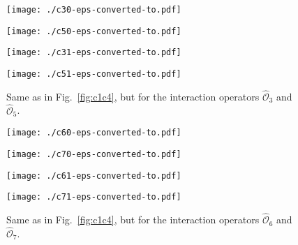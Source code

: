 \documentclass[11pt,a4paper]{article}
\begin{document}
\begin{figure}[t]
\begin{center}
\begin{minipage}[t]{0.49\linewidth}
\centering
\texttt{[image: ./c30-eps-converted-to.pdf]}
\end{minipage}
\begin{minipage}[t]{0.49\linewidth}
\centering
\texttt{[image: ./c50-eps-converted-to.pdf]}
\end{minipage}
\begin{minipage}[t]{0.49\linewidth}
\centering
\texttt{[image: ./c31-eps-converted-to.pdf]}
\end{minipage}
\begin{minipage}[t]{0.49\linewidth}
\centering
\texttt{[image: ./c51-eps-converted-to.pdf]}
\end{minipage}
\end{center}
\caption{Same as in Fig.~\ref{fig:c1c4}, but for the interaction operators $\hat{\mathcal{O}}_3$ and $\hat{\mathcal{O}}_5$.}
\label{fig:c3c5}
\end{figure}
\begin{figure}[t]
\begin{center}
\begin{minipage}[t]{0.49\linewidth}
\centering
\texttt{[image: ./c60-eps-converted-to.pdf]}
\end{minipage}
\begin{minipage}[t]{0.49\linewidth}
\centering
\texttt{[image: ./c70-eps-converted-to.pdf]}
\end{minipage}
\begin{minipage}[t]{0.49\linewidth}
\centering
\texttt{[image: ./c61-eps-converted-to.pdf]}
\end{minipage}
\begin{minipage}[t]{0.49\linewidth}
\centering
\texttt{[image: ./c71-eps-converted-to.pdf]}
\end{minipage}
\end{center}
\caption{Same as in Fig.~\ref{fig:c1c4}, but for the interaction operators $\hat{\mathcal{O}}_6$ and $\hat{\mathcal{O}}_7$.}
\label{fig:c6c7}
\end{figure}
\end{document}
